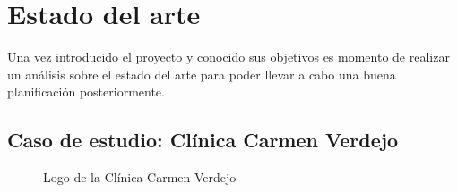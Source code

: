 \chapter{Estado del arte} \label{estado-arte}
Una vez introducido el proyecto y conocido sus objetivos es momento de realizar un análisis sobre el estado del arte para poder llevar a cabo una buena planificación posteriormente.

\section{Caso de estudio: Clínica Carmen Verdejo}
\begin{figure}[H]
    \caption{Logo de la Clínica Carmen Verdejo}
    \label{fig:carmen-verdejo}
\end{figure}

